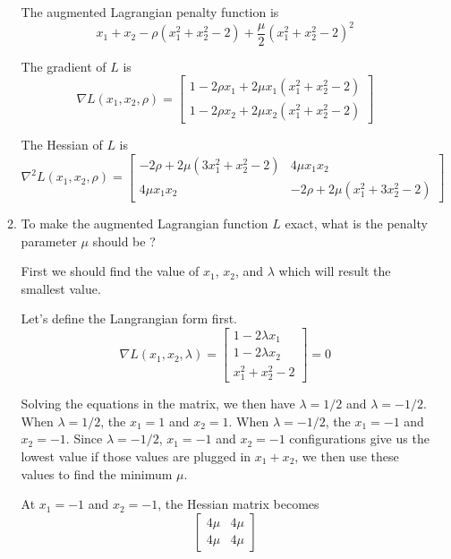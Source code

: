 \documentclass[a4paper,10pt]{article}
\begin{document}
\begin{enumerate}
\begin{enumerate}
        {\color{blue} 
            The augmented Lagrangian penalty function is
            \[
                x_1 + x_2 - \rho (x_1^2 + x_2^2 - 2) + \frac{\mu}{2}(x_1^2 + x_2^2 - 2)^2
            \]

            The gradient of $L$ is
            \[
                \nabla L(x_1, x_2, \rho) = \begin{bmatrix}
                    1 - 2 \rho x_1 + 2 \mu x_1 (x_1^2 + x_2^2 - 2) \\
                    1 - 2 \rho x_2 + 2 \mu x_2 (x_1^2 + x_2^2 - 2)
                \end{bmatrix}
            \]

            The Hessian of $L$ is
            \[
                \nabla^2 L(x_1, x_2, \rho) = \begin{bmatrix}
                    -2 \rho + 2 \mu (3x_1^2 + x_2^2 - 2) & 4 \mu x_1 x_2 \\ 
                    4 \mu x_1 x_2 & -2 \rho + 2 \mu (x_1^2 + 3x_2^2 - 2)
                \end{bmatrix}
            \]
        }

        \item To make the augmented Lagrangian function $L$ exact, what is the penalty parameter $\mu$ should be ?
        {\color{blue} 
            First we should find the value of $x_1$, $x_2$, and $\lambda$ which will result the smallest value. 

            Let's define the Langrangian form first.
            \[
                \nabla L(x_1, x_2, \lambda) = \begin{bmatrix} 1 - 2 \lambda x_1 \\ 1 - 2 \lambda x_2 \\ x_1^2 + x_2^2 - 2 \end{bmatrix} = 0 
            \]
            
            Solving the equations in the matrix, we then have $\lambda = 1/2$ and $\lambda = -1/2$.
            When $\lambda = 1/2$, the $x_1 = 1$ and $x_2 = 1$.
            When $\lambda = -1/2$, the $x_1 = -1$ and $x_2 = -1$.
            Since $\lambda = -1/2$, $x_1 = -1$ and $x_2 = -1$ configurations give us the lowest value if those values are plugged in $x_1 + x_2$, we then use these values to find the minimum $\mu$.

            At $x_1 = -1$ and $x_2 = -1$, the Hessian matrix becomes
            \[
                \begin{bmatrix}
                    4\mu & 4\mu \\
                    4\mu & 4\mu
                \end{bmatrix}
            \]

}
\end{enumerate}
\end{enumerate}
\end{document}
